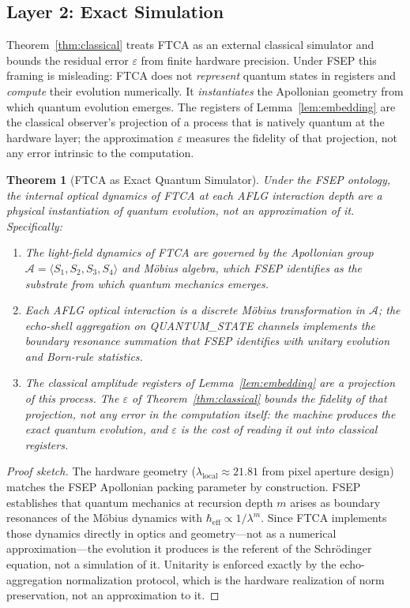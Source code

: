 \documentclass[11pt,letterpaper]{article}
\newtheorem{theorem}{Theorem}
\begin{document}
\subsection{Layer 2: Exact Simulation}

Theorem~\ref{thm:classical} treats FTCA as an external classical simulator and bounds the residual error $\varepsilon$ from finite hardware precision. Under FSEP this framing is misleading: FTCA does not \emph{represent} quantum states in registers and \emph{compute} their evolution numerically. It \emph{instantiates} the Apollonian geometry from which quantum evolution emerges. The registers of Lemma~\ref{lem:embedding} are the classical observer's projection of a process that is natively quantum at the hardware layer; the approximation $\varepsilon$ measures the fidelity of that projection, not any error intrinsic to the computation.

\begin{theorem}[FTCA as Exact Quantum Simulator]
\label{thm:exact}
Under the FSEP ontology, the internal optical dynamics of FTCA at each AFLG interaction depth are a physical instantiation of quantum evolution, not an approximation of it. Specifically:
\begin{enumerate}
  \item The light-field dynamics of FTCA are governed by the Apollonian group $\mathcal{A} = \langle S_1, S_2, S_3, S_4 \rangle$ and M\"obius algebra, which FSEP identifies as the substrate from which quantum mechanics emerges.
  \item Each AFLG optical interaction is a discrete M\"obius transformation in $\mathcal{A}$; the echo-shell aggregation on QUANTUM\_STATE channels implements the boundary resonance summation that FSEP identifies with unitary evolution and Born-rule statistics.
  \item The classical amplitude registers of Lemma~\ref{lem:embedding} are a projection of this process. The $\varepsilon$ of Theorem~\ref{thm:classical} bounds the fidelity of that projection, not any error in the computation itself: the machine produces the exact quantum evolution, and $\varepsilon$ is the cost of reading it out into classical registers.
\end{enumerate}
\end{theorem}

\begin{proof}[Proof sketch]
The hardware geometry ($\lambda_{\text{local}} \approx 21.81$ from pixel aperture design) matches the FSEP Apollonian packing parameter by construction. FSEP establishes that quantum mechanics at recursion depth $m$ arises as boundary resonances of the M\"obius dynamics with $\hbar_{\text{eff}} \propto 1/\lambda^m$. Since FTCA implements those dynamics directly in optics and geometry---not as a numerical approximation---the evolution it produces is the referent of the Schr\"odinger equation, not a simulation of it. Unitarity is enforced exactly by the echo-aggregation normalization protocol, which is the hardware realization of norm preservation, not an approximation to it.
\end{proof}
\end{document}
